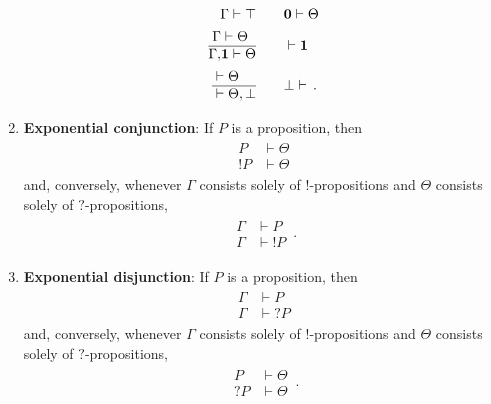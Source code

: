 \begin{enumerate}
\begin{gather}
                \begin{aligned}
                    \Gamma\vdash\top &\qquad \mathbf{0}\vdash\Theta\\
                    \begin{aligned}
                        \Gamma&\vdash\Theta\\
                        \hline
                        \Gamma,&\mathbf{1}\vdash\Theta
                    \end{aligned}
                    &\qquad \vdash\mathbf{1}
                    \\
                    \begin{aligned}
                        &\vdash\Theta\\
                        \hline
                        &\vdash\Theta,\bot
                    \end{aligned}
                    &\qquad \bot\vdash\,.
                \end{aligned}
            \end{gather}
        \item\textbf{Exponential conjunction}: If $P$ is a proposition, then
            \begin{gather}
                \begin{aligned}
                    P&\vdash\Theta\\
                    \hline
                    !P&\vdash\Theta
                \end{aligned}
            \end{gather}
            and, conversely, whenever $\Gamma$ consists solely of $!$-propositions and $\Theta$ consists solely of $?$-propositions,
            \begin{gather}
                \begin{aligned}
                    \Gamma&\vdash P\\
                    \hline
                    \Gamma&\vdash!P
                \end{aligned}\,.
            \end{gather}
        \item\textbf{Exponential disjunction}: If $P$ is a proposition, then
            \begin{gather}
                \begin{aligned}
                    \Gamma&\vdash P\\
                    \hline
                    \Gamma&\vdash?P
                \end{aligned}
            \end{gather}
            and, conversely, whenever $\Gamma$ consists solely of $!$-propositions and $\Theta$ consists solely of $?$-propositions,
            \begin{gather}
                \begin{aligned}
                    P&\vdash\Theta\\
                    \hline
                    ?P&\vdash\Theta
                \end{aligned}\,.
            \end{gather}
    \end{enumerate}
